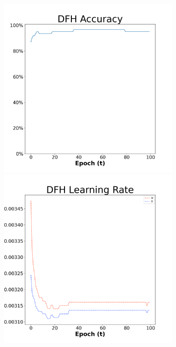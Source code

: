 \begin{figure}[H]
    \centering %
\begin{subfigure}{0.3\textwidth}
  \includegraphics[width=\linewidth]{images/exper1/breast/DFH_0.01_acc.png}
    \includegraphics[width=\linewidth]{images/exper1/breast/DFH_0.01_lr.png}

\end{subfigure}
\end{figure}
